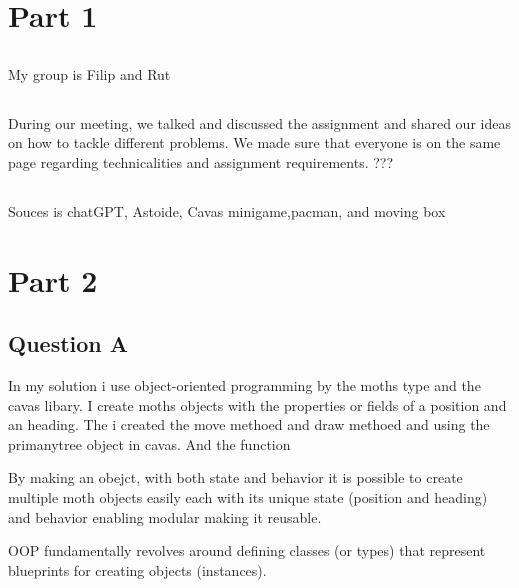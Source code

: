 \documentclass{article}
\begin{document}
\maketitle



\section{Part 1}

\subsection{}
My group is Filip and Rut

\subsection{}


During our meeting, we talked and discussed the assignment and shared our ideas on how
to tackle different problems. We made sure that everyone is on the same page regarding
technicalities and assignment requirements. ???


\subsection{}

Souces is chatGPT, Astoide, Cavas minigame,pacman, and moving box



\section{Part 2}

\subsection{Question A}

In my solution i use object-oriented programming by the moths type and the cavas libary. I create moths objects with the properties or fields of a position and an heading. The i created the move methoed and draw methoed and using the primanytree object in cavas. And the function 

By making an obejct, with both state and behavior it is possible to create multiple moth objects easily each with its unique state (position and heading) and behavior enabling modular making it reusable. 


OOP fundamentally revolves around defining classes (or types) that represent blueprints for creating objects (instances).
\end{document}
